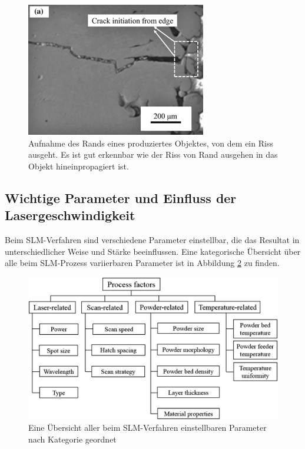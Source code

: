 		\begin{figure}[!ht]
			\centering
			\includegraphics[width=0.7\textwidth]{chapter/main/img/defects/cracks_part.png}
			\caption{Aufnahme des Rands eines produziertes Objektes, von dem ein Riss ausgeht. Es
			ist gut erkennbar wie der Riss von Rand ausgehen in das Objekt hineinpropagiert ist.
			\cite{zhang2017defect}}
			\label{fig:defects_cracks}
		\end{figure}

	\subsection{Wichtige Parameter und Einfluss der Lasergeschwindigkeit}
		Beim SLM-Verfahren sind verschiedene Parameter einstellbar, die das Resultat in
		unterschiedlicher Weise und Stärke beeinflussen. Eine kategorische Übersicht über alle
		beim SLM-Prozess variierbaren Parameter ist in Abbildung \ref{fig:scheme_parameters} zu
		finden.

		\begin{figure}[!ht]
			\centering
			\includegraphics[width=\textwidth]{chapter/main/img/scheme_parameters_2.png}
			\caption{Eine Übersicht aller beim SLM-Verfahren einstellbaren Parameter nach
			Kategorie geordnet \cite{zhang2017defect,aboulkhair2014reducing}}
			\label{fig:scheme_parameters}
		\end{figure}

